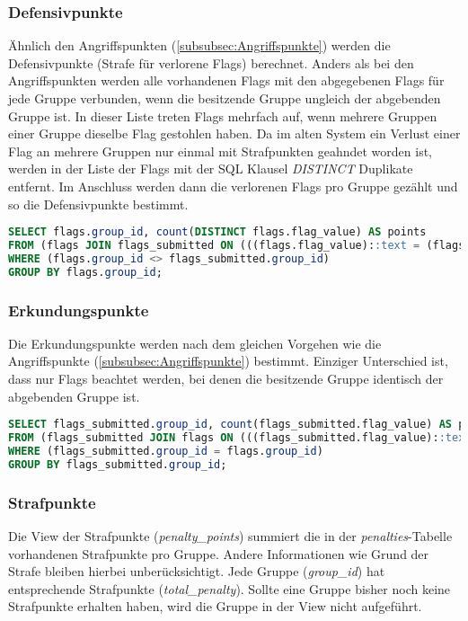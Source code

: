 \subsubsection{Defensivpunkte}
Ähnlich den Angriffspunkten (\ref{subsubsec:Angriffspunkte}) werden die Defensivpunkte (Strafe für verlorene Flags) berechnet. Anders als bei den Angriffspunkten werden alle vorhandenen Flags mit den abgegebenen Flags für jede Gruppe verbunden, wenn die besitzende Gruppe ungleich der abgebenden Gruppe ist. In dieser Liste treten Flags mehrfach auf, wenn mehrere Gruppen einer Gruppe dieselbe Flag gestohlen haben. Da im alten System ein Verlust einer Flag an mehrere Gruppen nur einmal mit Strafpunkten geahndet worden ist, werden in der Liste der Flags mit der SQL Klausel \textit{DISTINCT} Duplikate entfernt. Im Anschluss werden dann die verlorenen Flags pro Gruppe gezählt und so die Defensivpunkte bestimmt.

\begin{lstlisting}[frame=single, language=sql, caption={SQL View Denfensivpunkte}, captionpos=b, label={lst:database-defence-points}]
SELECT flags.group_id, count(DISTINCT flags.flag_value) AS points
FROM (flags JOIN flags_submitted ON (((flags.flag_value)::text = (flags_submitted.flag_value)::text)))
WHERE (flags.group_id <> flags_submitted.group_id)
GROUP BY flags.group_id;
\end{lstlisting}

\subsubsection{Erkundungspunkte}
Die Erkundungspunkte werden nach dem gleichen Vorgehen wie die Angriffspunkte (\ref{subsubsec:Angriffspunkte}) bestimmt. Einziger Unterschied ist, dass nur Flags beachtet werden, bei denen die besitzende Gruppe identisch der abgebenden Gruppe ist.

\begin{lstlisting}[frame=single, language=sql, caption={SQL View Erkundungspunkte}, captionpos=b, label={lst:database-discover-points}]
SELECT flags_submitted.group_id, count(flags_submitted.flag_value) AS points
FROM (flags_submitted JOIN flags ON (((flags_submitted.flag_value)::text = (flags.flag_value)::text)))
WHERE (flags_submitted.group_id = flags.group_id)
GROUP BY flags_submitted.group_id;
\end{lstlisting}

\subsubsection{Strafpunkte}
Die View der Strafpunkte (\textit{penalty\_points}) summiert die in der \textit{penalties}-Tabelle vorhandenen Strafpunkte pro Gruppe. Andere Informationen wie Grund der Strafe bleiben hierbei unberücksichtigt. Jede Gruppe (\textit{group\_id}) hat entsprechende Strafpunkte (\textit{total\_penalty}). Sollte eine Gruppe bisher noch keine Strafpunkte erhalten haben, wird die Gruppe in der View nicht aufgeführt.


